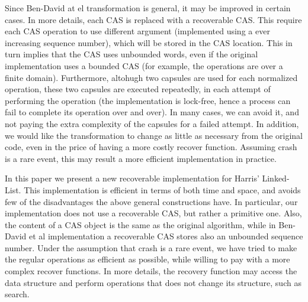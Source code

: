 Since Ben-David at el transformation is general, it may be improved in certain cases. In more details, each CAS is replaced with a recoverable CAS. This require each CAS operation to use different argument (implemented using a ever increasing sequence number), which will be stored in the CAS location. This in turn implies that the CAS uses unbounded words, even if the original implementation uses a bounded CAS (for example, the operations are over a finite domain). Furthermore, altohugh two capsules are used for each normalized operation, these two capsules are executed repeatedly, in each attempt of performing the operation (the implementation is lock-free, hence a process can fail to complete its operation over and over). In many cases, we can avoid it, and not paying the extra complexity of the capsules for a failed attempt.
In addition, we would like the transformation to change as little as necessary from the original code, even in the price of having a more costly recover function. Assuming crash is a rare event, this may result a more efficient implementation in practice.








In this paper we present a new recoverable implementation for Harris' Linked-List. This implementation is efficient in terms of both time and space, and avoids few of the disadvantages the above general constructions have. In particular, our implementation does not use a recoverable CAS, but rather a primitive one. Also, the content of a CAS object is the same as the original algorithm, while in Ben-David et al implementation a recoverable CAS stores also an unbounded sequence number. Under the assumption that crash is a rare event, we have tried to make the regular operations as efficient as possible, while willing to pay with a more complex recover functions. In more details, the recovery function may access the data structure and perform operations that does not change its structure, such as search.

